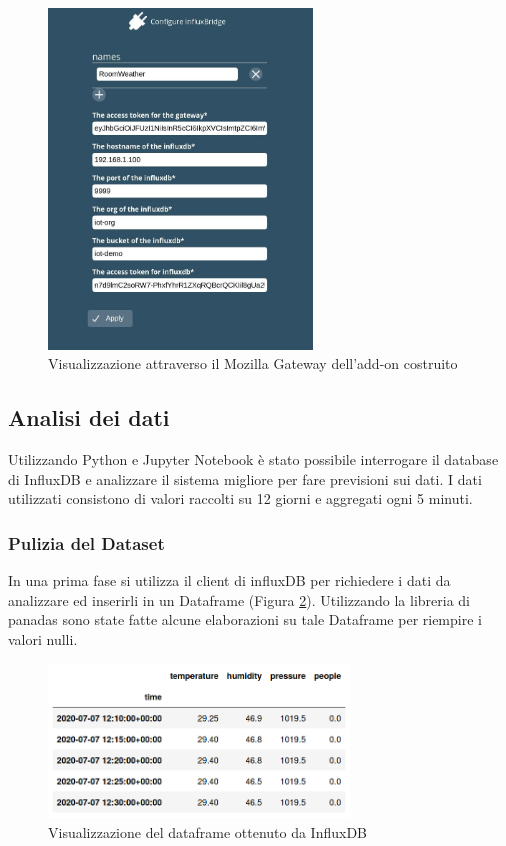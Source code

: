 \documentclass{article}
\begin{document}
\begin{figure}
    \centering
    \includegraphics[width=7cm]{img/influx-bridge.jpg}
    \caption{Visualizzazione attraverso il Mozilla Gateway dell'add-on costruito}
    \label{fig:addon}
\end{figure}

\subsection{Analisi dei dati}
Utilizzando Python e Jupyter Notebook è stato possibile interrogare il database di InfluxDB e analizzare il sistema migliore per fare previsioni sui dati. I dati utilizzati consistono di valori raccolti su 12 giorni e aggregati ogni 5 minuti. 

\subsubsection{Pulizia del Dataset}
In una prima fase si utilizza il client di influxDB per richiedere i dati da analizzare ed inserirli in un Dataframe (Figura \ref{fig:df_table}). Utilizzando la libreria di panadas sono state fatte alcune elaborazioni su tale Dataframe per riempire i valori nulli.

\begin{figure}
    \centering
    \includegraphics[width=8cm]{img/dfTable.png}
    \caption{Visualizzazione del dataframe ottenuto da InfluxDB}
    \label{fig:df_table}
\end{figure}
\end{document}
